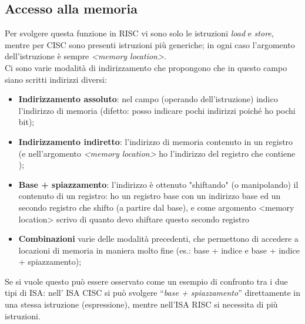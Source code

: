 \documentclass[class=book, crop=false]{standalone}
\begin{document}
\subsection{Accesso alla memoria}
Per svolgere questa funzione in RISC vi sono solo le istruzioni \emph{load} e \emph{store}, mentre per CISC sono presenti istruzioni più generiche; in ogni caso l’argomento dell’istruzione è sempre \emph{<memory location>}.\\
Ci sono varie modalità di indirizzamento che propongono che in questo campo siano scritti indirizzi diversi:
\begin{itemize}[noitemsep]
	\item \textbf{Indirizzamento assoluto}: nel campo (operando dell’istruzione)  indico l’indirizzo di memoria (difetto: posso indicare pochi indirizzi poiché ho pochi bit);
	\item \textbf{Indirizzamento indiretto}: l’indirizzo di memoria contenuto in un registro (e nell’argomento \emph{<memory location>} ho l’indirizzo del registro che contiene );
	\item \textbf{Base + spiazzamento}: l’indirizzo è ottenuto "shiftando" (o manipolando) il contenuto di un registro: ho un registro base con un indirizzo base ed un secondo registro che shifto (a partire dal base), e come argomento <memory location> scrivo di quanto devo shiftare questo secondo registro
	\item \textbf{Combinazioni} varie delle modalità precedenti, che permettono di accedere a locazioni di memoria in maniera molto fine (es.: base + indice e base + indice + spiazzamento);
\end{itemize}

Se si vuole questo può essere osservato come un esempio di confronto tra i due tipi di ISA: nell’ ISA CISC si può svolgere “\emph{base + spiazzamento}” direttamente in una stessa istruzione (espressione), mentre nell'ISA RISC si necessita di più istruzioni.
\end{document}
